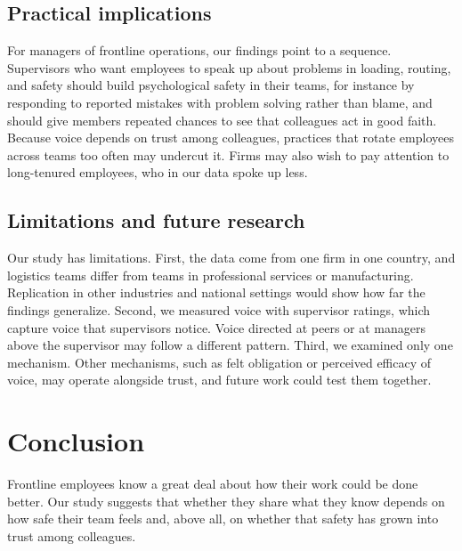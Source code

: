 \documentclass[11pt]{article}
\begin{document}
\subsection{Practical implications}

For managers of frontline operations, our findings point to a sequence. Supervisors who want employees to speak up about problems in loading, routing, and safety should build psychological safety in their teams, for instance by responding to reported mistakes with problem solving rather than blame, and should give members repeated chances to see that colleagues act in good faith. Because voice depends on trust among colleagues, practices that rotate employees across teams too often may undercut it. Firms may also wish to pay attention to long-tenured employees, who in our data spoke up less.

\subsection{Limitations and future research}

Our study has limitations. First, the data come from one firm in one country, and logistics teams differ from teams in professional services or manufacturing. Replication in other industries and national settings would show how far the findings generalize. Second, we measured voice with supervisor ratings, which capture voice that supervisors notice. Voice directed at peers or at managers above the supervisor may follow a different pattern. Third, we examined only one mechanism. Other mechanisms, such as felt obligation or perceived efficacy of voice, may operate alongside trust, and future work could test them together.

\section{Conclusion}

Frontline employees know a great deal about how their work could be done better. Our study suggests that whether they share what they know depends on how safe their team feels and, above all, on whether that safety has grown into trust among colleagues.
\end{document}
